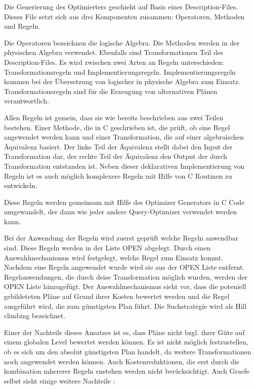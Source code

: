 Die Generierung des Optimierters geschieht auf Basis eines Description-Files. Dieses File setzt sich aus drei Komponenten zusammen: Operatoren, Methoden und Regeln.


Die Operatoren bezeichnen die logische Algebra. Die Methoden werden in der physischen Algebra verwendet. Ebenfalls sind Transformationen Teil des Description-Files. Es wird zwischen zwei Arten an Regeln unterschieden: Transformationsregeln und Implementierungsregeln. Implementierungsregeln kommen bei der Übersetzung von logischer in physische Algebra zum Einsatz. Transformationsregeln sind für die Erzeugung von alternativen Plänen verantwortlich.

Allen Regeln ist gemein, dass sie wie bereits beschrieben aus zwei Teilen bestehen. Einer Methode, die in C geschrieben ist, die prüft, ob eine Regel angewendet werden kann und einer Transformation, die auf einer algebraischen Äquivalenz basiert. Der linke Teil der Äquivalenz stellt dabei den Input der Transformation dar, der rechte Teil der Äquivalenz den Output der durch Transformation entstanden ist. Neben dieser deklarativen Implementierung von Regeln ist es auch möglich komplexere Regeln mit Hilfe von C Routinen zu entwickeln.

Diese Regeln werden gemeinsam mit Hilfe des Optimizer Generators in C Code umgewandelt, der dann wie jeder andere Query-Optimizer verwendet werden kann. 

Bei der Anwendung der Regeln wird zuerst geprüft welche Regeln anwendbar sind. Diese Regeln werden in der Liste OPEN abgelegt. Durch einen Auswahlmechanismus wird festgelegt, welche Regel zum Einsatz kommt. Nachdem eine Regeln angewendet wurde wird sie aus der OPEN Liste entfernt. Regelanwendungen, die durch deise Transformation möglich wurden, werden der OPEN Liste hinzugefügt. Der Auswahlmechanismus sieht vor, dass die poteniell gebildeteten Pläne auf Grund ihrer Kosten bewertet werden und die Regel ausgeführt wird, die zum günstigsten Plan führt. Die Suchstrategie wird als Hill climbing bezeichnet.

Einer der Nachteile dieses Ansatzes ist es, dass Pläne nicht bzgl. ihrer Güte auf einem globalen Level bewertet werden können. Es ist nicht möglich festzustellen, ob es sich um den absolut günstigsten Plan handelt, da weitere Transformationen noch angewendet werden können. Auch Kostenreduktionen, die erst durch die kombination mhererer Regeln enstehen werden nicht berücksichtigt. Auch Graefe selbst sieht einige weitere Nachteile \cite{graefe1993volcano}:


